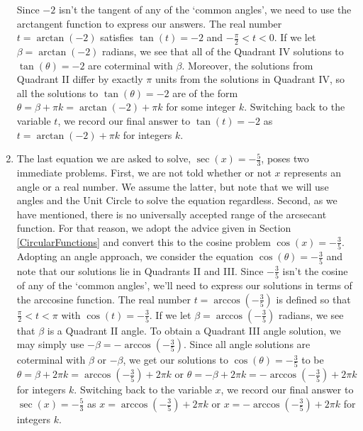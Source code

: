 \documentclass[12pt]{ximera}
\begin{document}
\begin{example}
\begin{enumerate}
\begin{tabular}{cc}
 \\

\end{tabular}

Since $-2$ isn't the tangent of any of the `common angles', we need to use the arctangent function to express our answers.  The real number $t = \arctan(-2)$ satisfies $\tan(t)=-2$  and $-\frac{\pi}{2} < t < 0$.   If we let $\beta = \arctan(-2)$ radians, we see that all of the Quadrant IV solutions to  $\tan(\theta) = -2$  are coterminal with $\beta$. Moreover, the solutions from Quadrant II differ by exactly $\pi$ units from the solutions in Quadrant IV, so all the solutions to $\tan(\theta) = -2$ are of the form $\theta = \beta + \pi k = \arctan(-2) + \pi k$ for some integer $k$.  Switching back to the variable $t$,  we record our final answer to $\tan(t) = -2$ as $t = \arctan(-2) + \pi k$ for integers $k$.


\item  The last equation we are asked to solve, $\sec(x) = -\frac{5}{3}$, poses two immediate problems.  First, we are not told whether or not $x$ represents an angle or a real number.  We assume the latter, but note that we will use angles and the Unit Circle to solve the equation regardless.  Second, as we have mentioned, there is no universally accepted range of the arcsecant function.  For that reason, we adopt the advice given in Section \ref{CircularFunctions} and convert this to the cosine problem $\cos(x) = -\frac{3}{5}$.  Adopting an angle approach, we consider the equation $\cos(\theta) = -\frac{3}{5}$ and note that our solutions lie in Quadrants II and III.  Since $-\frac{3}{5}$ isn't  the cosine of any of the `common angles', we'll need to express our solutions in terms of the arccosine function.  The real number $t = \arccos\left(-\frac{3}{5}\right)$ is defined so that $\frac{\pi}{2} < t < \pi$ with $\cos(t) = -\frac{3}{5}$.  If we let $\beta = \arccos\left(-\frac{3}{5}\right)$ radians, we see that $\beta$ is a Quadrant II angle.  To obtain a Quadrant III angle solution, we may simply use $-\beta = -\arccos\left(-\frac{3}{5}\right)$.  Since all angle solutions are coterminal with $\beta$ or $-\beta$, we get our solutions to $\cos(\theta) = -\frac{3}{5}$ to be $\theta = \beta + 2\pi k = \arccos\left(-\frac{3}{5}\right) + 2\pi k$ or $\theta = -\beta + 2\pi k = -\arccos\left(-\frac{3}{5}\right) + 2\pi k$ for integers $k$.  Switching back to the variable $x$,  we record our final answer to $\sec(x) = -\frac{5}{3}$ as $x = \arccos\left(-\frac{3}{5}\right) + 2\pi k$ or $x = -\arccos\left(-\frac{3}{5}\right) + 2\pi k$ for integers $k$.


\end{enumerate}
\end{example}
\end{document}
